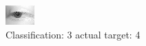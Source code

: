 \begin{figure}[h!]
\begin{center}
\includegraphics[width=0.60\columnwidth]{figures/ID2584_class_3_target_4.png}
\end{center}
\caption{ Classification: 3 actual target: 4}
\label{fig:ID2584_class_3_target_4}
\end{figure}
